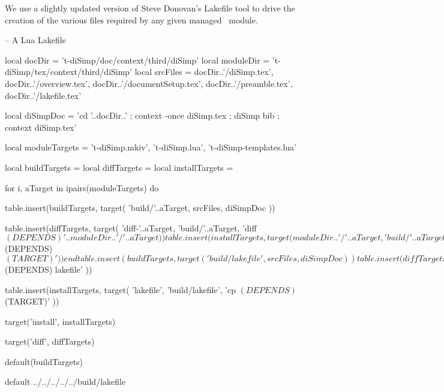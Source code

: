 
\startchapter[title=Lakefile]

We use a slightly updated version of Steve Donovan's Lakefile tool to 
drive the creation of the various files required by any given 
 managed \ConTeXt\ module. 

\startLakefile
-- A Lua Lakefile

local docDir    = 't-diSimp/doc/context/third/diSimp'
local moduleDir = 't-diSimp/tex/context/third/diSimp'
local srcFiles = {
  docDir..'/diSimp.tex',
  docDir..'/overview.tex',
  docDir..'/documentSetup.tex',
  docDir..'/preamble.tex',
  docDir..'/lakefile.tex'
}

local diSimpDoc =
  'cd '..docDir..' ; context -once diSimp.tex ; diSimp bib ; context diSimp.tex'

local moduleTargets = {
  't-diSimp.mkiv',
  't-diSimp.lua',
  't-diSimp-templates.lua'
}

local buildTargets   = { }
local diffTargets    = { }
local installTargets = { }

for i, aTarget in ipairs(moduleTargets) do

  table.insert(buildTargets, target(
    'build/'..aTarget,
    srcFiles,
    diSimpDoc
  ))

  table.insert(diffTargets, target(
    'diff-'..aTarget,
    'build/'..aTarget,
    'diff $(DEPENDS) '..moduleDir..'/'..aTarget
  ))

  table.insert(installTargets, target(
    moduleDir..'/'..aTarget,
    'build/'..aTarget,
    'cp $(DEPENDS) $(TARGET)'
  ))
end

table.insert(buildTargets, target(
  'build/lakefile',
  srcFiles,
  diSimpDoc
))

table.insert(diffTargets, target(
  'diff-lakefile',
  'build/lakefile',
  'diff $(DEPENDS) lakefile'
))

table.insert(installTargets, target(
  'lakefile',
  'build/lakefile',
  'cp $(DEPENDS) $(TARGET)'
))

target('install', installTargets)

target('diff', diffTargets)

default(buildTargets)
\stopLakefile

\createLakefileFile%
  {default}%
  {../../../../../build/lakefile}%
  {}

\stopchapter